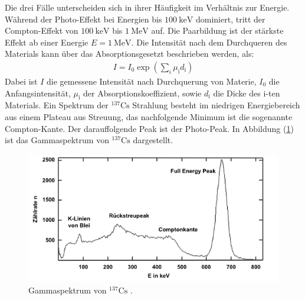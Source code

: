Die drei Fälle unterscheiden sich in ihrer Häufigkeit im Verhältnis zur Energie.
Während der Photo-Effekt bei Energien bis $\SI{100}{\kilo\electronvolt}$ dominiert, tritt der Compton-Effekt von $\SI{100}{\kilo\electronvolt}$ bis $\SI{1}{\mega\electronvolt}$ auf. Die Paarbildung ist der stärkste Effekt ab einer Energie $E=\SI{1}{\mega\electronvolt}$.
Die Intensität nach dem Durchqueren des Materials kann über das Absorptionsgesetzt beschrieben werden, als:
\begin{align}
  \label{eqn:Ab}
  I=I_\mathrm{0} \exp\left(\sum_i \mu_\mathrm{i} d_\mathrm{i}\right)
\end{align}
Dabei ist $I$ die gemessene Intensität nach Durchquerung von Materie, $I_\mathrm{0}$ die Anfangsintensität, $\mu_\mathrm{i}$ der Absorptionskoeffizient, sowie $d_\mathrm{i}$ die Dicke des i-ten Materials.
Ein Spektrum der ${}^{137}\mathrm{Cs}$ Strahlung besteht im niedrigen Energiebereich aus einem Plateau aus Streuung, das nachfolgende Minimum ist die sogenannte Compton-Kante. Der darauffolgende Peak ist der Photo-Peak. In Abbildung (\ref{fig:spekt}) ist das Gammaspektrum von ${}^{137}\mathrm{Cs}$ dargestellt.
\begin{figure}
	\centering
	\includegraphics[scale=0.7]{fig/spek_cs.png}
	\caption{Gammaspektrum von ${}^{137}\mathrm{Cs}$ \cite{leifi}.}
	\label{fig:spekt}
\end{figure}
\FloatBarrier
